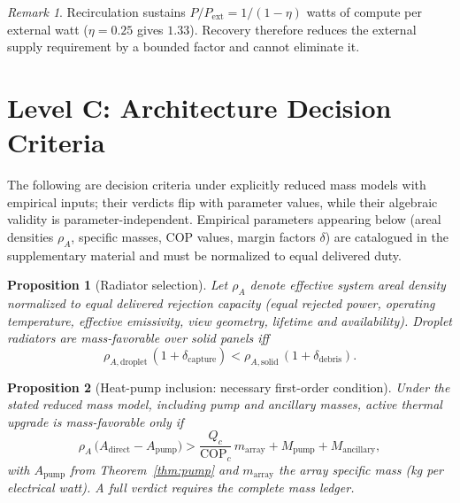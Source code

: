 \documentclass[11pt]{article}
\newtheorem{proposition}{Proposition}
\theoremstyle{definition}
\theoremstyle{remark}
\newtheorem{remark}{Remark}
\begin{document}
\begin{remark}
Recirculation sustains $P/P_{\mathrm{ext}}=1/(1-\eta)$ watts of compute per external watt ($\eta=0.25$ gives $1.33$). Recovery therefore reduces the external supply requirement by a bounded factor and cannot eliminate it.
\end{remark}

\section{Level C: Architecture Decision Criteria}\label{sec:levelC}

The following are decision criteria under explicitly reduced mass models with empirical inputs; their verdicts flip with parameter values, while their algebraic validity is parameter-independent. Empirical parameters appearing below (areal densities $\rho_{A}$, specific masses, COP values, margin factors $\delta$) are catalogued in the supplementary material and must be normalized to equal delivered duty.

\begin{proposition}[Radiator selection]\label{prop:p1}
Let $\rho_{A}$ denote effective system areal density normalized to equal delivered rejection capacity (equal rejected power, operating temperature, effective emissivity, view geometry, lifetime and availability). Droplet radiators are mass-favorable over solid panels iff
\begin{equation}
\rho_{A,\mathrm{droplet}}\,(1+\delta_{\mathrm{capture}})
<\rho_{A,\mathrm{solid}}\,(1+\delta_{\mathrm{debris}}).
\end{equation}
\end{proposition}

\begin{proposition}[Heat-pump inclusion: necessary first-order condition]\label{prop:p2}
Under the stated reduced mass model, including pump and ancillary masses, active thermal upgrade is mass-favorable only if
\begin{equation}
\rho_{A}\,\bigl(A_{\mathrm{direct}}-A_{\mathrm{pump}}\bigr)
>\frac{Q_{c}}{\mathrm{COP}_{c}}\,m_{\mathrm{array}}
+M_{\mathrm{pump}}+M_{\mathrm{ancillary}},
\end{equation}
with $A_{\mathrm{pump}}$ from Theorem~\ref{thm:pump} and $m_{\mathrm{array}}$ the array specific mass (kg per electrical watt). A full verdict requires the complete mass ledger.
\end{proposition}
\end{document}

